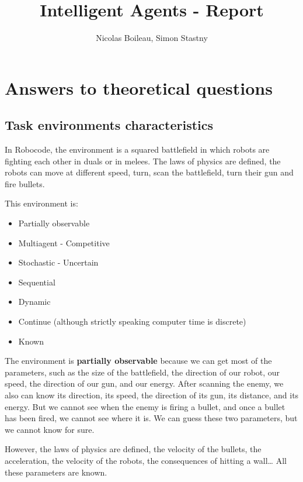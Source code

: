 \documentclass{article}
\begin{document}
\title{Intelligent Agents - Report}
\author{Nicolas Boileau, Simon Stastny}

\maketitle

\section{Answers to theoretical questions}

\subsection{Task environments characteristics}

In Robocode, the environment is a squared battlefield in which robots are
fighting each other in duals or in melees. The laws of physics are defined, the
robots can move at different speed, turn, scan the battlefield, turn their gun
and fire bullets.

This environment is:

\begin{itemize}
  \item Partially observable
  \item Multiagent - Competitive
  \item Stochastic - Uncertain
  \item Sequential
  \item Dynamic
  \item Continue (although strictly speaking computer time is discrete)
  \item Known
\end{itemize}

The environment is \textbf{partially observable} because we can get most of the
parameters, such as the size of the battlefield, the direction of our robot, our
speed, the direction of our gun, and our energy. After scanning the enemy, we
also can know its direction, its speed, the direction of its gun, its distance,
and its energy. But we cannot see when the enemy is firing a bullet, and once a
bullet has been fired, we cannot see where it is. We can guess these two
parameters, but we cannot know for sure.

However, the laws of physics are defined, the velocity of the bullets, the
acceleration, the velocity of the robots, the consequences of hitting a wall\ldots
All these parameters are known.
\end{document}
